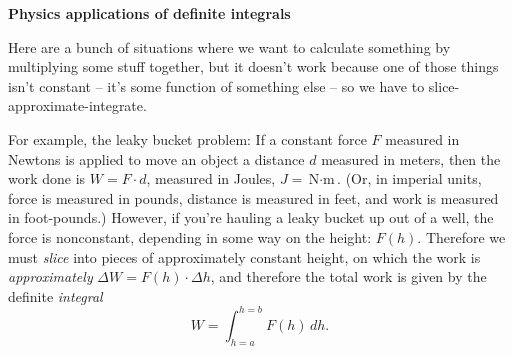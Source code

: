 \documentclass[12pt]{article}
\renewcommand{\section}[1]{\begin{center} \textbf{#1} \\\end{center}}
\begin{document}
%


\allowdisplaybreaks
\section{Physics applications of definite integrals}
Here are a bunch of situations where we want to calculate something by multiplying some stuff together, but it doesn't work because one of those things isn't constant -- it's some function of something else -- so we have to slice-approximate-integrate.

For example, the leaky bucket problem: If a constant force \(F\) measured in Newtons is applied to move an object a distance \(d\) measured in meters, then the work done is \(W = F\cdot d\), measured in Joules, \(\unit{J} = \unit{\N \cdot \m}\). (Or, in imperial units, force is measured in pounds, distance is measured in feet, and work is measured in foot-pounds.) However, if you're hauling a leaky bucket up out of a well, the force is nonconstant, depending in some way on the height: \(F(h)\). Therefore we must \textit{slice} into pieces of approximately constant height, on which the work is \textit{approximately} \(\Delta W = F(h) \cdot \Delta h\), and therefore the total work is given by the definite \textit{integral} \[W = \int_{h=a}^{h=b} F(h) \, dh.\]

\vfill

\hrulefill
\end{document}
